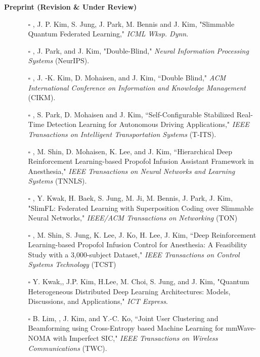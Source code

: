 \documentclass[10pt,letterpaper]{article}
\begin{document}
\headedsection
  {\textbf{Preprint (Revision \& Under Review)}}
  {} {
      \vspace{0.3mm}
      \vspace{-0.7mm}
      \begin{itemize} \itemsep=-0.1mm
      \item[]
      \begin{itemize}
      \item[$\square$] 
            , J. P. Kim, S. Jung, J. Park, M. Bennis and J. Kim, "Slimmable Quantum Federated Learning," \textit{ICML Wksp. Dynn}.
      \item[$\square$] 
            , J. Park, and J. Kim, "Double-Blind," \textit{Neural Information Processing Systems} (NeurIPS).
          \item[$\square$] , J. -K. Kim, D. Mohaisen, and J. Kim, ``Double Blind," \textit{ACM International Conference on Information and Knowledge Management} (CIKM).
          \item[$\square$] , S. Park, D. Mohaisen and J. Kim, ``Self-Configurable Stabilized Real-Time Detection Learning for Autonomous Driving Applications," \textit{IEEE Transactions on Intelligent Transportation Systems} (T-ITS).
          \item[$\square$] , M. Shin, D. Mohaisen, K. Lee, and J. Kim, ``Hierarchical Deep Reinforcement Learning-based Propofol Infusion Assistant Framework in Anesthesia," \textit{IEEE Transactions on Neural Networks and Learning Systems} (TNNLS).
          \item[$\square$] , Y. Kwak, H. Baek, S. Jung, M. Ji, M. Bennis, J. Park, J. Kim, "SlimFL: Federated Learning with Superposition Coding over Slimmable Neural Networks," \textit{IEEE/ACM Transactions on Networking} (TON)
          \item[$\square$] ,  M. Shin, S. Jung, K. Lee, J. Ko, H. Lee, J. Kim, ``Deep Reinforcement Learning-based Propofol Infusion Control for Anesthesia: A Feasibility Study with a 3,000-subject Dataset," \textit{IEEE Transactions on Control Systems Technology} (TCST)
          \item[$\square$] 
            Y. Kwak,, J.P. Kim, H.Lee, M. Choi, S. Jung, and J. Kim, "Quantum Heterogeneous Distributed Deep Learning Architectures: Models, Discussions, and Applications," \textit{ICT Express}.
          \item[$\square$] B. Lim, , J. Kim, and Y.-C. Ko, ``Joint User Clustering and Beamforming using Cross-Entropy based Machine Learning for mmWave-NOMA with Imperfect SIC," \textit{IEEE Transactions on Wireless Communications} (TWC).

\end{itemize}
\end{itemize}}
\end{document}
